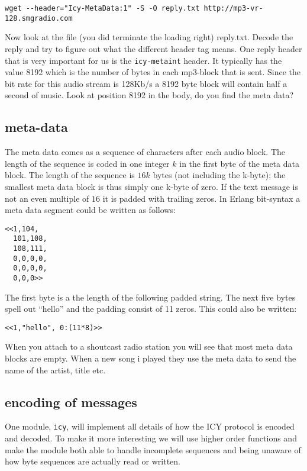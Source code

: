 \documentclass[a4paper,11pt]{article}
\begin{document}
\begin{verbatim}
wget --header="Icy-MetaData:1" -S -O reply.txt http://mp3-vr-128.smgradio.com
\end{verbatim}

Now look at the file (you did terminate the loading right)
reply.txt. Decode the reply and try to figure out what the different
header tag means. One reply header that is very important for us is the
{\tt icy-metaint} header. It typically has the value 8192 which is the
number of bytes in each mp3-block that is sent. Since the bit rate for
this audio stream is 128Kb/s a 8192 byte block will contain half a
second of music. Look at position 8192 in the body, do you find the
meta data?


\subsection{meta-data}

The meta data comes as a sequence of characters after each audio
block. The length of the sequence is coded in one integer $k$ in the
first byte of the meta data block. The length of the sequence is $16k$
bytes (not including the k-byte); the smallest meta data block is thus
simply one k-byte of zero. If the text message is not an even multiple
of $16$ it is padded with trailing zeros. In Erlang bit-syntax a meta
data segment could be written as follows:

\begin{verbatim}
<<1,104,
  101,108,
  108,111,
  0,0,0,0,
  0,0,0,0,
  0,0,0>>
\end{verbatim}

The first byte is a the length of the following padded string. The
next five bytes spell out ``hello'' and the padding consist of 11
zeros. This could also be written:

\begin{verbatim}
<<1,"hello", 0:(11*8)>>
\end{verbatim}


When you attach to a shoutcast radio station you will see that most
meta data blocks are empty. When a new song i played they use the
meta data to send the name of the artist, title etc. 

\subsection{encoding of messages}

One module, {\tt icy}, will implement all details of how the ICY
protocol is encoded and decoded. To make it more interesting we will
use higher order functions and make the module both able to handle
incomplete sequences and being unaware of how byte sequences are
actually read or written.
\end{document}
